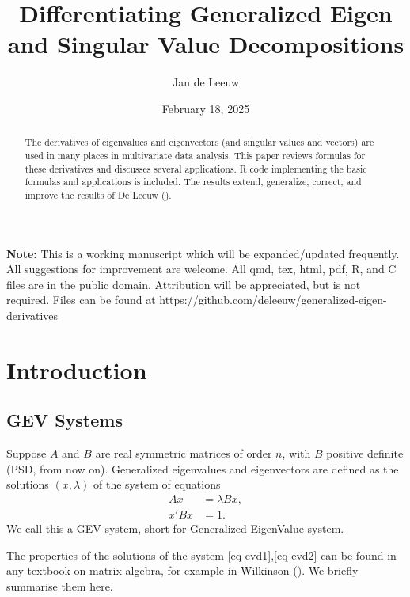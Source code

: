\documentclass[
  12pt,
  letterpaper,
  DIV=11,
  numbers=noendperiod]{scrartcl}
\title{Differentiating Generalized Eigen and Singular Value
Decompositions}
\author{Jan de Leeuw}
\date{February 18, 2025}
\newcommand{\sectionbreak}{\clearpage}
\renewcommand*\contentsname{Table of contents}
\newcommand\contentsname{Table of contents}
\begin{document}
\maketitle
\begin{abstract}
The derivatives of eigenvalues and eigenvectors (and singular values and
vectors) are used in many places in multivariate data analysis. This
paper reviews formulas for these derivatives and discusses several
applications. R code implementing the basic formulas and applications is
included. The results extend, generalize, correct, and improve the
results of De Leeuw ().
\end{abstract}

\renewcommand*\contentsname{Table of contents}
{
\hypersetup{linkcolor=}
\setcounter{tocdepth}{3}
\tableofcontents
}

\sectionbreak

\textbf{Note:} This is a working manuscript which will be
expanded/updated frequently. All suggestions for improvement are
welcome. All qmd, tex, html, pdf, R, and C files are in the public
domain. Attribution will be appreciated, but is not required. Files can
be found at https://github.com/deleeuw/generalized-eigen-derivatives

\sectionbreak

\section{Introduction}\label{sec-intro}

\subsection{GEV Systems}\label{gev-systems}

Suppose \(A\) and \(B\) are real symmetric matrices of order \(n\), with
\(B\) positive definite (PSD, from now on). Generalized eigenvalues and
eigenvectors are defined as the solutions \((x,\lambda)\) of the system
of equations \begin{subequations}
\begin{align}
Ax&=\lambda Bx,\label{eq-evd1}\\
x'Bx&=1.\label{eq-evd2}
\end{align}
\end{subequations} We call this a GEV system, short for Generalized
EigenValue system.

The properties of the solutions of the system
\eqref{eq-evd1},\eqref{eq-evd2} can be found in any textbook on matrix
algebra, for example in Wilkinson ().
We briefly summarise them here.
\end{document}
